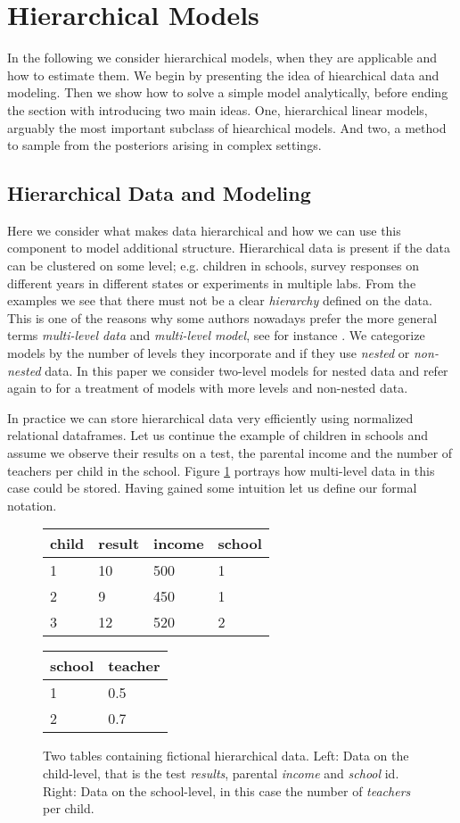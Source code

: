 \section{Hierarchical Models}
In the following we consider hierarchical models, when they are applicable and how to estimate them.
We begin by presenting the idea of hiearchical data and modeling.
Then we show how to solve a simple model analytically, before ending the section with introducing two main ideas.
One, hierarchical linear models, arguably the most important subclass of hiearchical models.
And two, a method to sample from the posteriors arising in complex settings.

\subsection{Hierarchical Data and Modeling}
Here we consider what makes data hierarchical and how we can use this component to model additional structure.
Hierarchical data is present if the data can be clustered on some level; e.g. children in schools, survey responses on different years in different states or experiments in multiple labs.
From the examples we see that there must not be a clear \emph{hierarchy} defined on the data.
This is one of the reasons why some authors nowadays prefer the more general terms \emph{multi-level data} and \emph{multi-level model}, see for instance \citet{GelmanHill2007}.
We categorize models by the number of levels they incorporate and if they use \emph{nested} or \emph{non-nested} data.
In this paper we consider two-level models for nested data and refer again to \citet{GelmanHill2007} for a treatment of models with more levels and non-nested data.

In practice we can store hierarchical data very efficiently using normalized relational dataframes. Let us continue the example of children in schools and assume we observe their results on a test, the parental income and the number of teachers per child in the school.
Figure \ref{fig:relational_table} portrays how multi-level data in this case could be stored.
Having gained some intuition let us define our formal notation.
\begin{figure}[!ht]
\begin{center}
\begin{tabular}{l l l l}
child & result & income & school\\
\hline
1 & 10 & 500 & 1\\
2 & 9 & 450 & 1\\
3 & 12 & 520 & 2
\end{tabular}
\quad
\begin{tabular}{l l}
school & teacher\\
\hline
1 & 0.5\\
2 & 0.7
\end{tabular}
\end{center}
\caption{Two tables containing fictional hierarchical data. Left: Data on the child-level, that is the test \emph{results}, parental \emph{income} and \emph{school} id. Right: Data on the school-level, in this case the number of \emph{teachers} per child.}
\label{fig:relational_table}
\end{figure}

